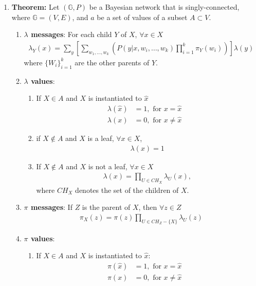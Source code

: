 \documentclass[12pt,twoside]{article}
\begin{document}
\begin{enumerate}
\item \textbf{Theorem:} Let $(\mathbb{G}, P)$ be a Bayesian network that is singly-connected, where $\mathbb{G} = (V,E)$, and $a$ be a set of values of a subset $A\subset V$. 
\begin{enumerate}
\item \textbf{$\lambda$ messages}: For each child $Y$ of $X$, $\forall x \in X$
\begin{align*}
\lambda_Y(x) = \sum_y \left[ \sum_{w_1,\dots, w_k} \left(P(y\vert x, w_i,\dots,w_k)\prod_{i=1}^k \pi_Y(w_i)\right)\right] \lambda(y)
\end{align*}
where $\lbrace W_i \rbrace_{i=1}^k$ are the other parents of $Y$.

\item \textbf{$\lambda$ values}: 
\begin{enumerate}
\item If $X\in A$ and $X$ is instantiated to $\hat{x}$
\begin{align*}
\lambda(\hat{x})& = 1,		\text{ for } x = \hat{x}&\\
\lambda(x) & = 0,				\text{ for } x\neq \hat{x}&
\end{align*}

\item if $X \notin A$ and $X$ is a leaf, $\forall x \in X$, 
\begin{align*}
\lambda(x) = 1
\end{align*}

\item If $X \notin A$ and $X$ is not a leaf, $\forall x \in X$
\begin{align*}
\lambda(x) = \prod_{U\in CH_X} \lambda_U (x),
\end{align*}
where $CH_X$ denotes the set of the children of $X$.
\end{enumerate}

\item  \textbf{$\pi$ messages}: If $Z$ is the parent of $X$, then $\forall z \in Z$
\begin{align*}
\pi_X(z) = \pi(z) \prod_{U\in CH_Z-\lbrace X\rbrace} \lambda_U(z)
\end{align*}

\item \textbf{$\pi$ values}:
\begin{enumerate}

\item If $X\in A$ and $X$ is instantiated to $\hat{x}$:
\begin{align*}
\pi(\hat{x})& = 1,		\text{ for } x = \hat{x}&\\
\pi(x) & = 0,				\text{ for } x\neq \hat{x}&
\end{align*}


\end{enumerate}
\end{enumerate}
\end{enumerate}
\end{document}
